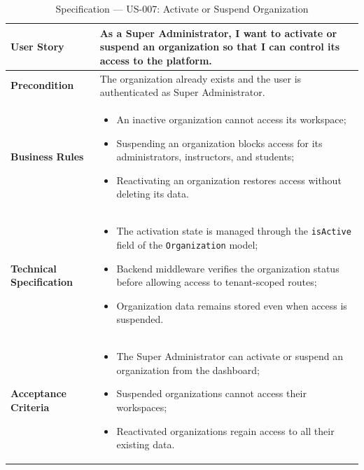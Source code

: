 \begin{table}[H]
\centering
\caption{Specification — US-007: Activate or Suspend Organization}
\label{tab:us007}
\renewcommand{\arraystretch}{1}
\begin{tabularx}{\textwidth}{|p{2.5cm}|X|}
\hline
\textbf{User Story} & As a Super Administrator, I want to activate or suspend an organization so that I can control its access to the platform. \\
\hline
\textbf{Precondition} & The organization already exists and the user is authenticated as Super Administrator. \\
\hline
\textbf{Business Rules} &
\begin{itemize}
  \item An inactive organization cannot access its workspace;
  \item Suspending an organization blocks access for its administrators, instructors, and students;
  \item Reactivating an organization restores access without deleting its data.
\end{itemize} \\
\hline
\textbf{Technical Specification} &
\begin{itemize}
  \item The activation state is managed through the \texttt{isActive} field of the \texttt{Organization} model;
  \item Backend middleware verifies the organization status before allowing access to tenant-scoped routes;
  \item Organization data remains stored even when access is suspended.
\end{itemize} \\
\hline
\textbf{Acceptance Criteria} &
\begin{itemize}
  \item The Super Administrator can activate or suspend an organization from the dashboard;
  \item Suspended organizations cannot access their workspaces;
  \item Reactivated organizations regain access to all their existing data.
\end{itemize} \\
\hline
\end{tabularx}
\end{table}


